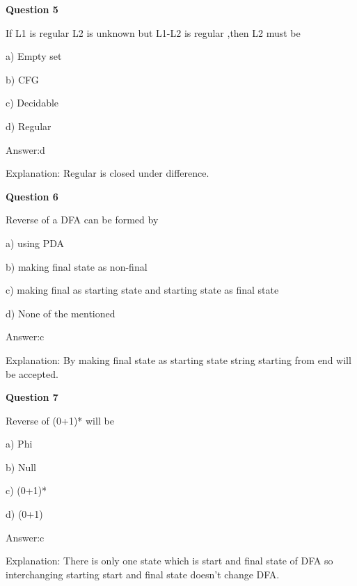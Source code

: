 \documentclass{article}
\begin{document}
\begin{mdframed}[linewidth=1pt, roundcorner=5pt, linecolor=gray!30, backgroundcolor=gray!5]
\textbf{Question 5} 

If L1 is regular L2 is unknown but L1-L2 is regular ,then L2 must be

a) Empty set

b) CFG

c) Decidable

d) Regular
\vspace{5pt} \par
\begin{tcolorbox}[colback=green!5, colframe=green!40!black, title=Solution]
Answer:d

Explanation: Regular is closed under difference.

\end{tcolorbox}
\end{mdframed}

\begin{mdframed}[linewidth=1pt, roundcorner=5pt, linecolor=gray!30, backgroundcolor=gray!5]
\textbf{Question 6} 

Reverse of a DFA can be formed by

a) using PDA

b) making final state as non-final

c) making final as starting state and starting state as final state

d) None of the mentioned
\vspace{5pt} \par
\begin{tcolorbox}[colback=green!5, colframe=green!40!black, title=Solution]
Answer:c

Explanation: By making final state as starting state string starting from end will be accepted.
\end{tcolorbox}
\end{mdframed}
\newpage

\begin{mdframed}[linewidth=1pt, roundcorner=5pt, linecolor=gray!30, backgroundcolor=gray!5]
\textbf{Question 7} 

Reverse of (0+1)* will be

a) Phi

b) Null

c) (0+1)*

d) (0+1)
\vspace{5pt} \par
\begin{tcolorbox}[colback=green!5, colframe=green!40!black, title=Solution]
Answer:c

Explanation: There is only one state which is start and final state of DFA so interchanging starting start and final state doesn't change DFA.
\end{tcolorbox}
\end{mdframed}
\end{document}
